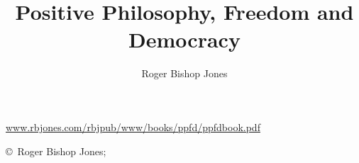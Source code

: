 \documentclass[10pt,titlepage]{book}
\author{Roger Bishop Jones}
\title{Positive Philosophy, Freedom and Democracy}
\newcommand{\ignore}[1]{}
\begin{document}
\frontmatter

\begin{titlepage}
\maketitle

\vfill

\begin{centering}

\ignore{
{\parskip=0.3in
This book is dedicated to

{\relsize{+3} Barbara Anne Jones}
}
}

\vfill

{\footnotesize



\href{http://www.rbjones.com/rbjpub/www/books/ppfd/ppfdbook.pdf}{www.rbjones.com/rbjpub/www/books/ppfd/ppfdbook.pdf}


\copyright\ Roger Bishop Jones;

}%

\end{centering}

\thispagestyle{empty}
\end{titlepage}

{\parskip=0pt\tableofcontents}
\end{document}

